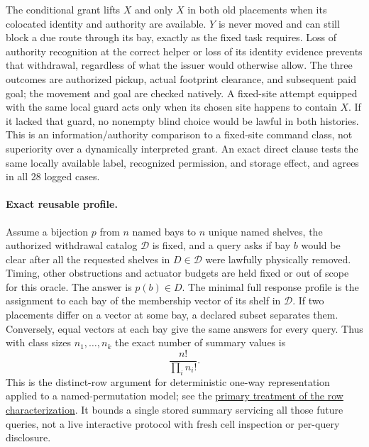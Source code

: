\documentclass[11pt]{article}
\begin{document}
The conditional grant lifts $X$ and only $X$ in both old placements
when its colocated identity and authority are available. $Y$ is never
moved and can still block a due route through its bay, exactly as
the fixed task requires. Loss of authority recognition at the correct
helper or loss of its identity evidence prevents that withdrawal,
regardless of what the issuer would otherwise allow. The three
outcomes are authorized pickup, actual footprint clearance, and
subsequent paid goal; the movement and goal are checked natively.
A fixed-site attempt equipped with the same local guard
acts only when its chosen site happens to contain $X$. If it lacked
that guard, no nonempty blind choice would be lawful in both histories.
This is an information/authority comparison to a fixed-site command
class, not superiority over a dynamically interpreted grant.
An exact direct clause tests the same locally available label,
recognized permission, and storage effect, and agrees in all
28 logged cases.

\paragraph{Exact reusable profile.}
Assume a bijection $p$ from $n$ named bays to $n$ unique named
shelves, the authorized withdrawal catalog $\mathcal D$ is fixed,
and a query asks if bay $b$ would be clear after all the requested
shelves in $D\in\mathcal D$ were lawfully physically removed.
Timing, other obstructions and actuator budgets are held fixed or
out of scope for this oracle. The answer is $p(b)\in D$. The
minimal full response profile is the assignment to each bay of
the membership vector of its shelf in $\mathcal D$. If two
placements differ on a vector at some bay, a declared subset
separates them. Conversely, equal vectors at each bay give the
same answers for every query. Thus with class sizes
$n_1,\ldots,n_k$ the exact number of summary values is
\[
 \frac{n!}{\prod_i n_i!}.
\]
This is the distinct-row argument for deterministic one-way
representation applied to a named-permutation model; see the
\href{https://eccc.weizmann.ac.il/report/2025/073/revision/1/download/}
{primary treatment of the row characterization}.
It bounds a single stored summary servicing all those future
queries, not a live interactive protocol with fresh cell
inspection or per-query disclosure.
\end{document}
